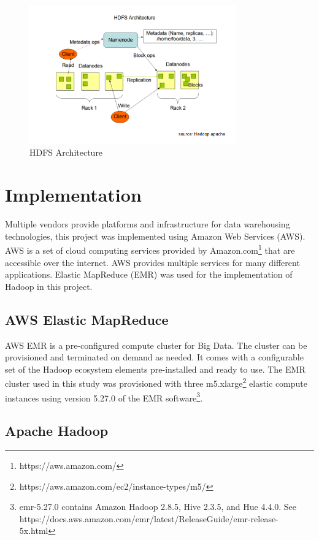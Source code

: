 \documentclass[journal]{IEEEtran}
\begin{document}
\begin{figure}
	\centering
	\includegraphics[width=3.5in]{HDFS_Arch.png}
	\caption{HDFS Architecture \cite{HDFS}}
	\label{HDFS}
\end{figure}

\section{Implementation}

Multiple vendors provide platforms and infrastructure for data warehousing technologies, 
 this project was implemented using Amazon Web Services (AWS).
AWS is a set of cloud computing services provided by Amazon.com\footnote{https://aws.amazon.com/}
 that are accessible over the internet.
AWS provides multiple services for many different applications. 
Elastic MapReduce (EMR) was used for the implementation of Hadoop in this project.

\subsection{AWS Elastic MapReduce}

AWS EMR is a pre-configured compute cluster for Big Data.
The cluster can be provisioned and terminated on demand as needed.
It comes with a configurable set of the Hadoop ecosystem elements pre-installed and ready to use.
The EMR cluster used in this study was provisioned with three
 m5.xlarge\footnote{https://aws.amazon.com/ec2/instance-types/m5/}
 elastic compute instances using version 5.27.0 of the EMR 
 software\footnote{emr-5.27.0 contains Amazon Hadoop 2.8.5, Hive 2.3.5, and Hue 4.4.0. See https://docs.aws.amazon.com/emr/latest/ReleaseGuide/emr-release-5x.html}.

\subsection{Apache Hadoop}
\end{document}
